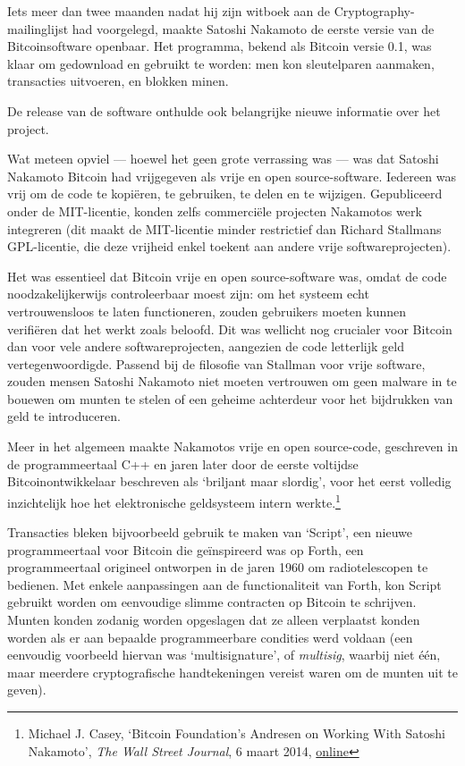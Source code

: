 \documentclass[smalldemyvopaper,11pt,twoside,onecolumn,openright,extrafontsizes,hidelinks]{memoir}
\begin{document}
Iets meer dan twee maanden nadat hij zijn witboek aan de
Cryptography-mailinglijst had voorgelegd, maakte Satoshi Nakamoto de
eerste versie van de Bitcoinsoftware openbaar. Het programma, bekend als
Bitcoin versie 0.1, was klaar om gedownload en gebruikt te worden: men
kon sleutelparen aanmaken, transacties uitvoeren, en blokken minen.

De release van de software onthulde ook belangrijke nieuwe informatie
over het project.

Wat meteen opviel --- hoewel het geen grote verrassing was --- was dat
Satoshi Nakamoto Bitcoin had vrijgegeven als vrije en open
source-software. Iedereen was vrij om de code te kopiëren, te gebruiken,
te delen en te wijzigen. Gepubliceerd onder de MIT-licentie, konden
zelfs commerciële projecten Nakamotos werk integreren (dit maakt de
MIT-licentie minder restrictief dan Richard Stallmans GPL-licentie, die
deze vrijheid enkel toekent aan andere vrije softwareprojecten).

Het was essentieel dat Bitcoin vrije en open source-software was, omdat
de code noodzakelijkerwijs controleerbaar moest zijn: om het systeem
echt vertrouwensloos te laten functioneren, zouden gebruikers moeten
kunnen verifiëren dat het werkt zoals beloofd. Dit was wellicht nog
crucialer voor Bitcoin dan voor vele andere softwareprojecten, aangezien
de code letterlijk geld vertegenwoordigde. Passend bij de filosofie van
Stallman voor vrije software, zouden mensen Satoshi Nakamoto niet moeten
vertrouwen om geen malware in te bouewen om munten te stelen of een
geheime achterdeur voor het bijdrukken van geld te introduceren.

Meer in het algemeen maakte Nakamotos vrije en open source-code,
geschreven in de programmeertaal C++ en jaren later door de eerste
voltijdse Bitcoinontwikkelaar beschreven als `briljant maar slordig',
voor het eerst volledig inzichtelijk hoe het elektronische geldsysteem
intern werkte.\footnote{Michael J. Casey, `Bitcoin Foundation's Andresen
  on Working With Satoshi Nakamoto', \emph{The Wall Street Journal}, 6
  maart 2014, \href{https://www.wsj.com/articles/BL-MBB-17626}{online}}

Transacties bleken bijvoorbeeld gebruik te maken van `Script', een
nieuwe programmeertaal voor Bitcoin die geïnspireerd was op Forth, een
programmeertaal origineel ontworpen in de jaren 1960 om radiotelescopen
te bedienen. Met enkele aanpassingen aan de functionaliteit van Forth,
kon Script gebruikt worden om eenvoudige slimme contracten op Bitcoin te
schrijven. Munten konden zodanig worden opgeslagen dat ze alleen
verplaatst konden worden als er aan bepaalde programmeerbare condities
werd voldaan (een eenvoudig voorbeeld hiervan was `multisignature', of
\emph{multisig}, waarbij niet één, maar meerdere cryptografische
handtekeningen vereist waren om de munten uit te geven).
\end{document}
